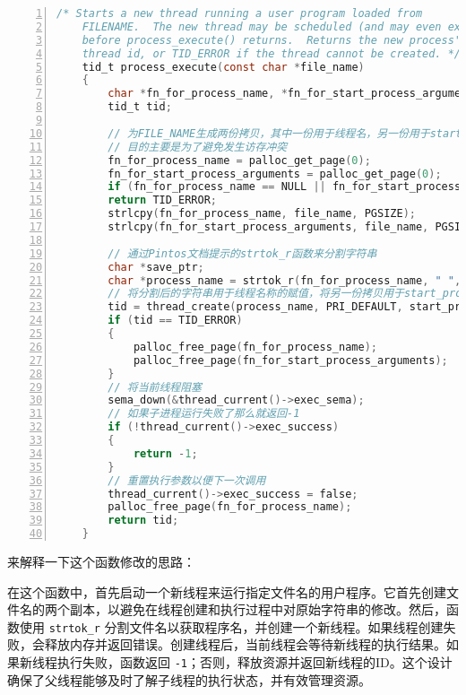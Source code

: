 \documentclass{article}
\begin{document}
	\begin{lstlisting}[xleftmargin = 4em,xrightmargin = 4em, aboveskip = 1em, numbers = left, language = C,title=src/userprog/process.c中process\_execute函数]
    /* Starts a new thread running a user program loaded from
    FILENAME.  The new thread may be scheduled (and may even exit)
    before process_execute() returns.  Returns the new process's
    thread id, or TID_ERROR if the thread cannot be created. */
    tid_t process_execute(const char *file_name)
    {
    	char *fn_for_process_name, *fn_for_start_process_arguments;
    	tid_t tid;
    	
    	// 为FILE_NAME生成两份拷贝，其中一份用于线程名，另一份用于start_process的参数
    	// 目的主要是为了避免发生访存冲突
    	fn_for_process_name = palloc_get_page(0);
    	fn_for_start_process_arguments = palloc_get_page(0);
    	if (fn_for_process_name == NULL || fn_for_start_process_arguments == NULL)
    	return TID_ERROR;
    	strlcpy(fn_for_process_name, file_name, PGSIZE);
    	strlcpy(fn_for_start_process_arguments, file_name, PGSIZE);
    	
    	// 通过Pintos文档提示的strtok_r函数来分割字符串
    	char *save_ptr;
    	char *process_name = strtok_r(fn_for_process_name, " ", &save_ptr);
    	// 将分割后的字符串用于线程名称的赋值，将另一份拷贝用于start_process进行处理
    	tid = thread_create(process_name, PRI_DEFAULT, start_process, fn_for_start_process_arguments);
    	if (tid == TID_ERROR)
    	{
    		palloc_free_page(fn_for_process_name);
    		palloc_free_page(fn_for_start_process_arguments);
    	}
    	// 将当前线程阻塞
    	sema_down(&thread_current()->exec_sema);
    	// 如果子进程运行失败了那么就返回-1
    	if (!thread_current()->exec_success)
    	{
    		return -1;
    	}
    	// 重置执行参数以便下一次调用
    	thread_current()->exec_success = false;
    	palloc_free_page(fn_for_process_name);
    	return tid;
    }
	\end{lstlisting}
	
	来解释一下这个函数修改的思路：
	
	在这个函数中，首先启动一个新线程来运行指定文件名的用户程序。它首先创建文件名的两个副本，以避免在线程创建和执行过程中对原始字符串的修改。然后，函数使用 \texttt{strtok\_r} 分割文件名以获取程序名，并创建一个新线程。如果线程创建失败，会释放内存并返回错误。创建线程后，当前线程会等待新线程的执行结果。如果新线程执行失败，函数返回 \texttt{-1}；否则，释放资源并返回新线程的ID。这个设计确保了父线程能够及时了解子线程的执行状态，并有效管理资源。\\
	
\end{document}
